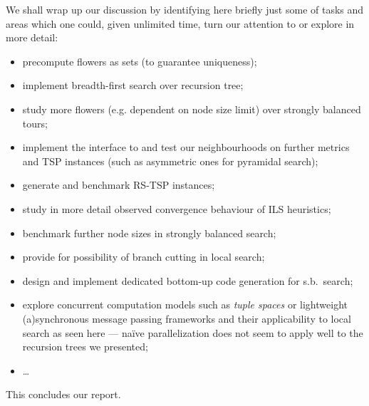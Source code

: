 \documentclass[index=totoc,bibliography=totoc]{scrartcl}
\numberwithin{equation}{section}
\numberwithin{figure}{section}
\numberwithin{table}{section}
\let\defstyle\itshape
\begin{document}
We shall wrap up our discussion by identifying here briefly just some of tasks
and areas which one could, given unlimited time, turn our attention to or
explore in more detail:
\begin{itemize}
  \item
    precompute flowers as sets (to guarantee uniqueness);
  \item
    implement breadth-first search over recursion tree;
  \item
    study more flowers (e.g. dependent on node size limit) over strongly balanced tours;
  \item
    implement the interface to and test our neighbourhoods on further metrics
    and TSP instances (such as asymmetric ones for pyramidal search);
  \item
    generate and benchmark RS-TSP instances;
  \item
    study in more detail observed convergence behaviour of ILS heuristics;
  \item
    benchmark further node sizes in strongly balanced search;
  \item
    provide for possibility of branch cutting in local search;
  \item
    design and implement dedicated bottom-up code generation for s.b.\ search;
  \item
    explore concurrent computation models
    such as {\defstyle tuple spaces} or
    lightweight (a)synchronous message passing frameworks
    and their applicability to local search as seen here ---
    naïve parallelization does not seem to apply well to the
    recursion trees we presented;
  \item
    \ldots
\end{itemize}
This concludes our report.

\begin{center}
\vspace{2em}
\vspace{2em}
\end{center}
\clearpage

\end{document}
